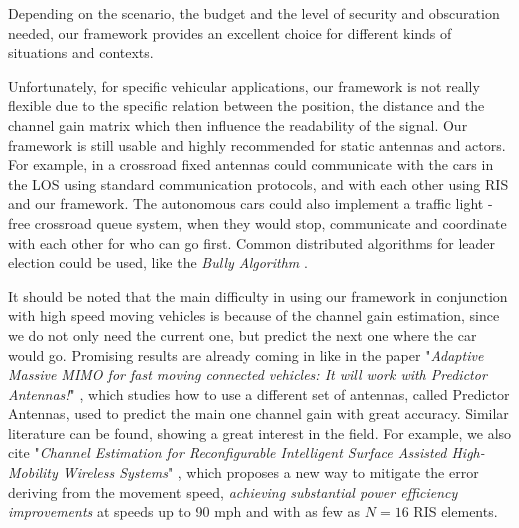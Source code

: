 Depending on the scenario, the budget and the level of security and obscuration needed, our framework provides an excellent choice for different kinds of situations and contexts.

Unfortunately, for specific vehicular applications, our framework is not really flexible due to the specific relation between the position, the distance and the channel gain matrix which then influence the readability of the signal. Our framework is still usable and highly recommended for static antennas and actors. For example, in a crossroad fixed antennas could communicate with the cars in the LOS using standard communication protocols, and with each other using RIS and our framework. The autonomous cars could also implement a traffic light - free crossroad queue system, when they would stop, communicate and coordinate with each other for who can go first. Common distributed algorithms for leader election could be used, like the \textit{Bully Algorithm} \cite{Bully_algorithm}.

It should be noted that the main difficulty in using our framework in conjunction with high speed moving vehicles is because of the channel gain estimation, since we do not only need the current one, but predict the next one where the car would go. Promising results are already coming in like in the paper "\textit{Adaptive Massive MIMO for fast moving connected vehicles: It will work with Predictor Antennas!}" \cite{8385489}, which studies how to use a different set of antennas, called Predictor Antennas, used to predict the main one channel gain with great accuracy. Similar literature can be found, showing a great interest in the field. For example, we also cite "\textit{Channel Estimation for Reconfigurable Intelligent Surface Assisted High-Mobility Wireless Systems}" \cite{9875062}, which proposes a new way to mitigate the error deriving from the movement speed, \textit{achieving substantial power efficiency improvements} at speeds up to 90 mph and with as few as $N=16$ RIS elements.